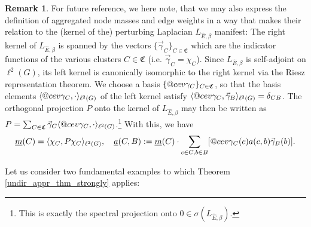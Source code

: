 \documentclass[reqno,12pt,letterpaper]{amsart}
\makeatletter
\numberwithin{equation}{section}
\DeclareRobustCommand{\cev}[1]{%
	\mathpalette\do@cev{#1}%
}
\newcommand{\do@cev}[2]{%
	\fix@cev{#1}{+}%
	\reflectbox{$\m@th#1\vec{\reflectbox{$\fix@cev{#1}{-}\m@th#1#2\fix@cev{#1}{+}$}}$}%
	\fix@cev{#1}{-}%
}
\newcommand{\fix@cev}[2]{%
	\ifx#1\displaystyle
	\mkern#23mu
	\else
	\ifx#1\textstyle
	\mkern#23mu
	\else
	\ifx#1\scriptstyle
	\mkern#22mu
	\else
	\mkern#22mu
	\fi
	\fi
	\fi
}
\newcommand{\1}{\mathds{1}}
\theoremstyle{definition}
\newtheorem{Rem}[Th]{Remark}
\makeatother
\begin{document}
\begin{Rem}\label{naturality_remark_undirected}
	For future reference, we here note, that we may also express the definition of aggregated node masses and edge weights in a way that makes their relation to the (kernel of the) perturbing Laplacian $L_{\hat{E},\beta}$  manifest: The right kernel of $L_{\hat{E},\beta}$ is spanned by the vectors  $\{\vec{\gamma}_C\}_{C \in \mathfrak{C}}$ which are the indicator functions of the various clusters $C \in \mathfrak{C}$  (i.e. $\vec{\gamma}_C = {\chi_C}$). Since $L_{\hat{E},\beta}$ is self-adjoint on $\ell^2(G)$, its left kernel is canonically isomorphic to the right kernel via the Riesz representation theorem. We choose a basis $\{\cev\gamma_C\}_{C \in \mathfrak{C}}$, so that the basis elements $\langle \cev{\gamma}_C, \cdot \rangle_{\ell^2(G)}$ of the left kernel satisfy  $\langle \cev{\gamma}_C, \vec{\gamma}_B \rangle_{\ell^2(G)} = \delta_{CB}$. The orthogonal projection $P$  onto the kernel of $L_{\hat{E}, \beta}$ may then be written as
	$
	P = \sum_{C \in \mathfrak{C}} \vec{\gamma}_C \langle \cev{\gamma}_C, \cdot \rangle_{\ell^2(G)}
	$.\footnote{ This is exactly the spectral projection onto $0 \in \sigma(L_{\hat{E},\beta})$.}
	With this, we have
	\begin{align}
		\underline{m}(C) = \langle \chi_C, P \chi_C \rangle_{\ell^2(G)}, \quad 
		\underline{a}(C, B) := \underline{m}(C)\cdot\sum\limits_{c \in C, b \in B} 
		[
		\cev{\gamma}_{C}(c)
		a(c,b)
		\vec{\gamma}_B(b)
		].
	\end{align} 
\end{Rem}




	\medskip
	Let us  consider two fundamental examples to which Theorem \ref{undir_appr_thm_strongly} applies:
	
\end{document}
